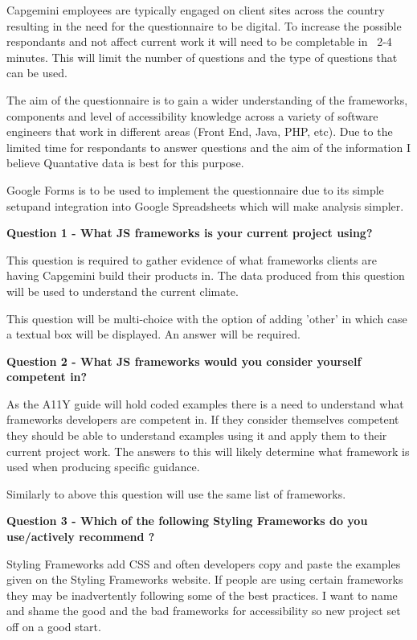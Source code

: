 Capgemini employees are typically engaged on client sites across the country
resulting in the need for the questionnaire to be digital. To increase
the possible respondants and not affect current work it will need to be
completable in ~2-4 minutes. This will limit the number of questions and the
type of questions that can be used.

The aim of the questionnaire is to gain a wider understanding of the
frameworks, components and level of accessibility knowledge across a variety
of software engineers that work in different areas (Front End, Java, PHP,
etc). Due to the limited time for respondants to answer questions and the
aim of the information I believe Quantative data is best for this purpose.

Google Forms is to be used to implement the questionnaire due to its simple
setupand integration into Google Spreadsheets which will make analysis simpler.

\textbf{Question 1 - What JS frameworks is your current project
using?}

This question is required to gather evidence of what frameworks clients are
having Capgemini build their products in. The data produced from this
question will be used to understand the current climate.

This question will be multi-choice with the option of adding 'other' in which
case a textual box will be displayed. An answer will be required.

\textbf{Question 2 - What JS frameworks would you consider yourself
competent in?}

As the A11Y guide will hold coded examples there is a need to understand what
frameworks developers are competent in. If they consider themselves competent
they should be able to understand examples using it and apply them to their
current project work. The answers to this will likely determine what
framework is used when producing specific guidance.

Similarly to above this question will use the same list of frameworks.

\textbf{Question 3 - Which of the following Styling Frameworks do you
use/actively recommend ?}

Styling Frameworks add CSS and often developers copy and paste the examples
given on the Styling Frameworks website. If people are using certain
frameworks they may be inadvertently following some of the best practices. I
want to name and shame the good and the bad frameworks for accessibility so
new project set off on a good start.

